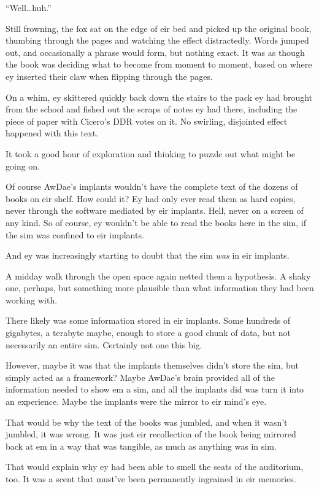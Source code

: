 ``Well\ldots{}huh.''

Still frowning, the fox sat on the edge of eir bed and picked up the original book, thumbing through the pages and watching the effect distractedly. Words jumped out, and occasionally a phrase would form, but nothing exact. It was as though the book was deciding what to become from moment to moment, based on where ey inserted their claw when flipping through the pages.

On a whim, ey skittered quickly back down the stairs to the pack ey had brought from the school and fished out the scraps of notes ey had there, including the piece of paper with Cicero's DDR votes on it. No swirling, disjointed effect happened with this text.

It took a good hour of exploration and thinking to puzzle out what might be going on.

Of course AwDae's implants wouldn't have the complete text of the dozens of books on eir shelf. How could it? Ey had only ever read them as hard copies, never through the software mediated by eir implants. Hell, never on a screen of any kind. So of course, ey wouldn't be able to read the books here in the sim, if the sim was confined to eir implants.

And ey was increasingly starting to doubt that the sim \emph{was} in eir implants.

A midday walk through the open space again netted them a hypothesis. A shaky one, perhaps, but something more plausible than what information they had been working with.

There likely was some information stored in eir implants. Some hundreds of gigabytes, a terabyte maybe, enough to store a good chunk of data, but not necessarily an entire sim. Certainly not one this big.

However, maybe it was that the implants themselves didn't store the sim, but simply acted as a framework? Maybe AwDae's brain provided all of the information needed to show em a sim, and all the implants did was turn it into an experience. Maybe the implants were the mirror to eir mind's eye.

That would be why the text of the books was jumbled, and when it wasn't jumbled, it was wrong. It was just eir recollection of the book being mirrored back at em in a way that was tangible, as much as anything was in sim.

That would explain why ey had been able to smell the seats of the auditorium, too. It was a scent that must've been permanently ingrained in eir memories.


